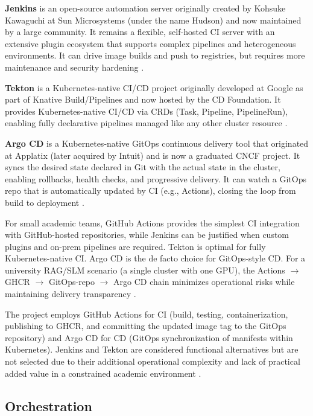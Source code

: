 \textbf{Jenkins} is an open-source automation server originally created by Kohsuke Kawaguchi at Sun Microsystems (under the name Hudson) and now maintained by a large community. It remains a flexible, self-hosted CI server with an extensive plugin ecosystem that supports complex pipelines and heterogeneous environments. It can drive image builds and push to registries, but requires more maintenance and security hardening \parencite{CICDTool40:online}.

\textbf{Tekton} is a Kubernetes-native CI/CD project originally developed at Google as part of Knative Build/Pipelines and now hosted by the CD Foundation. It provides Kubernetes-native CI/CD via CRDs (Task, Pipeline, PipelineRun), enabling fully declarative pipelines managed like any other cluster resource \parencite{CICDTool40:online}.

\textbf{Argo CD} is a Kubernetes-native GitOps continuous delivery tool that originated at Applatix (later acquired by Intuit) and is now a graduated CNCF project. It syncs the desired state declared in Git with the actual state in the cluster, enabling rollbacks, health checks, and progressive delivery. It can watch a GitOps repo that is automatically updated by CI (e.g., Actions), closing the loop from build to deployment \parencite{ArgoCDDe97:online}.

For small academic teams, GitHub Actions provides the simplest CI integration with GitHub-hosted repositories, while Jenkins can be justified when custom plugins and on-prem pipelines are required. Tekton is optimal for fully Kubernetes-native CI. Argo CD is the de facto choice for GitOps-style CD. For a university RAG/SLM scenario (a single cluster with one GPU), the Actions $\rightarrow$ GHCR $\rightarrow$ GitOps-repo $\rightarrow$ Argo CD chain minimizes operational risks while maintaining delivery transparency \parencite{CICDTool40:online,ArgoCDGi52:online,ArgoCDDe97:online,GitHubAc85:online}.

The project employs GitHub Actions for CI (build, testing, containerization, publishing to GHCR, and committing the updated image tag to the GitOps repository) and Argo CD for CD (GitOps synchronization of manifests within Kubernetes). Jenkins and Tekton are considered functional alternatives but are not selected due to their additional operational complexity and lack of practical added value in a constrained academic environment \parencite{CICDTool40:online,ArgoCDGi52:online,ArgoCDDe97:online,GitHubAc85:online}.

\subsection{Orchestration}


